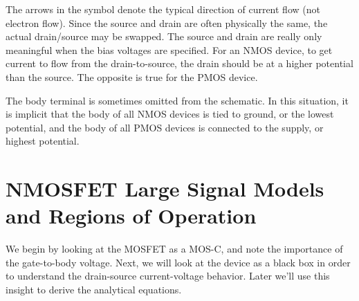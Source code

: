 The arrows in the symbol denote the typical direction of current flow (not electron flow).  Since the source and drain are often physically the same, the actual drain/source may be swapped.  The source and drain are really only meaningful when the bias voltages are specified. For an NMOS device, to get current to flow from the drain-to-source, the drain should be at a higher potential than the source.  The opposite is true for the PMOS device.

The body terminal is sometimes omitted from the schematic.  In this situation, it is implicit that the body of all NMOS devices is tied to ground, or the lowest potential, and the body of all PMOS devices is connected to the supply, or highest potential.
\section{NMOSFET Large Signal Models and Regions of Operation}
We begin by looking at the MOSFET as a MOS-C, and note the importance of the gate-to-body voltage.  Next, we will look at the device as a black box in order to understand the drain-source current-voltage behavior.  Later we'll use this insight to derive the analytical equations.
